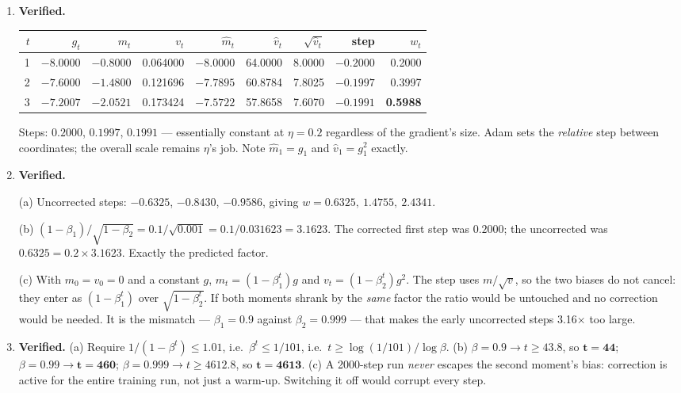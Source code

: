 \documentclass[11pt,a4paper]{article}
\newcommand{\A}[1]{\item[\textbf{#1}]}
\begin{document}
\begin{enumerate}[leftmargin=1.9cm]
\A{U3.33} \textbf{Verified.}
\begin{answerbox}
\begin{center}\footnotesize\begin{tabular}{@{}rrrrrrrrr@{}}\toprule
$t$ & $g_t$ & $m_t$ & $v_t$ & $\hat m_t$ & $\hat v_t$ & $\sqrt{\hat v_t}$ & step & $w_t$\\
\midrule
1 & $-8.0000$ & $-0.8000$ & 0.064000 & $-8.0000$ & 64.0000 & 8.0000 & $-0.2000$ & 0.2000\\
2 & $-7.6000$ & $-1.4800$ & 0.121696 & $-7.7895$ & 60.8784 & 7.8025 & $-0.1997$ & 0.3997\\
3 & $-7.2007$ & $-2.0521$ & 0.173424 & $-7.5722$ & 57.8658 & 7.6070 & $-0.1991$ & \textbf{0.5988}\\
\bottomrule\end{tabular}\end{center}
Steps: $0.2000$, $0.1997$, $0.1991$ --- essentially constant at $\eta = 0.2$
regardless of the gradient's size. Adam sets the \emph{relative} step between
coordinates; the overall scale remains $\eta$'s job. Note $\hat m_1 = g_1$ and
$\hat v_1 = g_1^2$ exactly.
\end{answerbox}

\A{U3.34} \textbf{Verified.}
\begin{answerbox}
(a) Uncorrected steps: $\mathbf{-0.6325}$, $\mathbf{-0.8430}$,
$\mathbf{-0.9586}$, giving $w = 0.6325,\ 1.4755,\ 2.4341$.

(b) $(1-\beta_1)/\sqrt{1-\beta_2} = 0.1/\sqrt{0.001} = 0.1/0.031623 =
\mathbf{3.1623}$. The corrected first step was $0.2000$; the uncorrected was
$0.6325 = 0.2 \times 3.1623$. Exactly the predicted factor.

(c) With $m_0 = v_0 = 0$ and a constant $g$, $m_t = (1-\beta_1^t)g$ and
$v_t = (1-\beta_2^t)g^2$. The step uses $m/\sqrt v$, so the two biases do not
cancel: they enter as $(1-\beta_1^t)$ over $\sqrt{1-\beta_2^t}$. If both
moments shrank by the \emph{same} factor the ratio would be untouched and no
correction would be needed. It is the mismatch --- $\beta_1 = 0.9$ against
$\beta_2 = 0.999$ --- that makes the early uncorrected steps 3.16$\times$ too
large.
\end{answerbox}

\A{U3.35} \textbf{Verified.} (a) Require $1/(1-\beta^t) \le 1.01$, i.e.\
$\beta^t \le 1/101$, i.e.\ $t \ge \log(1/101)/\log\beta$. (b)
$\beta = 0.9 \to t \ge 43.8$, so $\mathbf{t = 44}$;
$\beta = 0.99 \to \mathbf{t = 460}$;
$\beta = 0.999 \to t \ge 4612.8$, so $\mathbf{t = 4613}$.
(c) A 2000-step run \emph{never} escapes the second moment's bias: correction
is active for the entire training run, not just a warm-up. Switching it off
would corrupt every step.


\end{enumerate}
\end{document}
